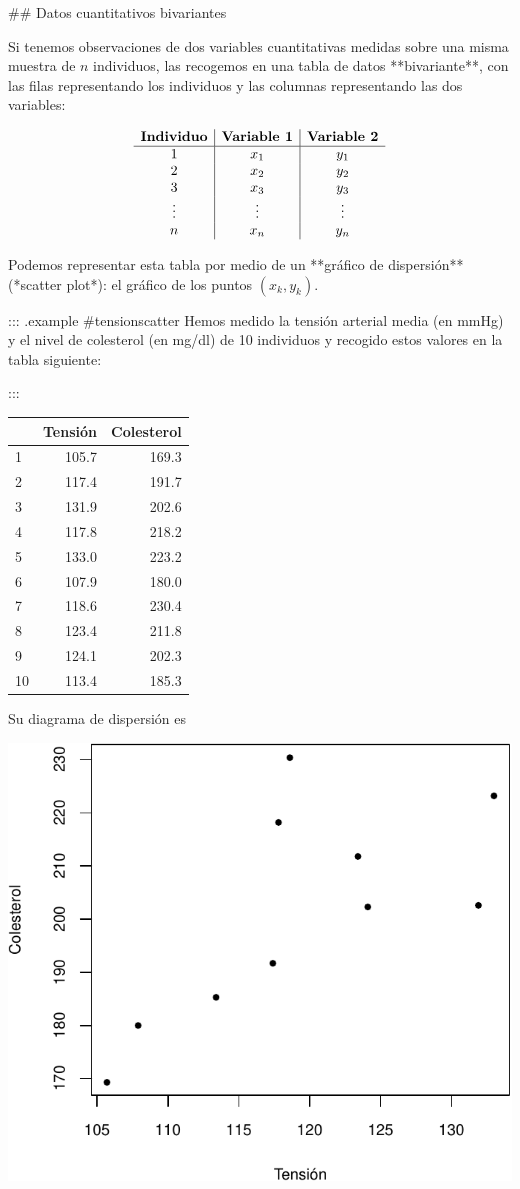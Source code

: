 \documentclass[
]{book}
\theoremstyle{definition}
\theoremstyle{definition}
\theoremstyle{definition}
\theoremstyle{definition}
\theoremstyle{remark}
\begin{document}
## Datos cuantitativos bivariantes

Si tenemos observaciones de dos variables cuantitativas medidas sobre una misma muestra de $n$ individuos, las recogemos en una tabla de datos **bivariante**,  con las filas representando los individuos y las columnas representando las dos variables:

$$
\begin{array}{c|c|c}
\textbf{Individuo} &\textbf{Variable 1} &\textbf{Variable 2}\\ \hline
1 & x_{1} & y_{1} \cr
2 & x_{2} & y_{2} \cr
3 & x_{3} & y_{3} \cr
\vdots &\vdots & \vdots \cr 
n & x_{n} & y_{n} 
\end{array}
$$

Podemos representar esta tabla por medio de un **gráfico de dispersión** (*scatter plot*): el gráfico de los puntos $(x_k,y_k)$.

::: {.example #tensionscatter}
Hemos medido la tensión arterial media (en mmHg) y el nivel de colesterol (en mg/dl) de 10 individuos y recogido estos valores en la tabla siguiente:
  
:::

\begin{table}
\centering
\begin{tabular}{l|r|r}
\hline
  & Tensión & Colesterol\\
\hline
1 & 105.7 & 169.3\\
\hline
2 & 117.4 & 191.7\\
\hline
3 & 131.9 & 202.6\\
\hline
4 & 117.8 & 218.2\\
\hline
5 & 133.0 & 223.2\\
\hline
6 & 107.9 & 180.0\\
\hline
7 & 118.6 & 230.4\\
\hline
8 & 123.4 & 211.8\\
\hline
9 & 124.1 & 202.3\\
\hline
10 & 113.4 & 185.3\\
\hline
\end{tabular}
\end{table}

Su diagrama de dispersión es

\begin{center}\includegraphics[width=0.5\linewidth]{INREMDN_files/figure-latex/unnamed-chunk-300-1} \end{center}
\end{document}
